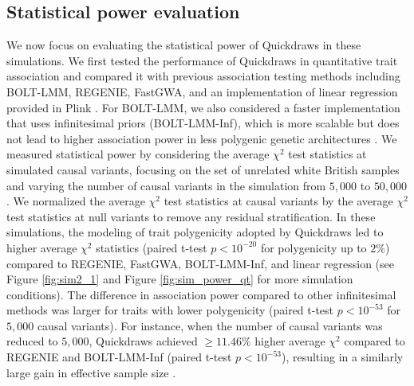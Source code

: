 \endgroup %

\clearpage

\subsection{Statistical power evaluation}
We now focus on evaluating the statistical power of Quickdraws in these simulations.
%
We first tested the performance of Quickdraws in quantitative trait association and compared it with previous association testing methods including BOLT-LMM, REGENIE, FastGWA, and an implementation of linear regression provided in Plink \cite{purcell2007plink,chang2015second}.
%
For BOLT-LMM, we also considered a faster implementation that uses infinitesimal priors (BOLT-LMM-Inf), which is more scalable but does not lead to higher association power in less polygenic genetic architectures \cite{loh2015efficient,loh2018mixed}.
%
We measured statistical power by considering the average $\chi^2$ test statistics at simulated causal variants, focusing on the set of unrelated white British samples and varying the number of causal variants in the simulation from $5{,}000$ to $50{,}000$ \cite{zeng2018signatures}.
%
We normalized the average $\chi^2$ test statistics at causal variants by the average $\chi^2$ test statistics at null variants to remove any residual stratification.
%
In these simulations, the modeling of trait polygenicity adopted by Quickdraws led to higher average $\chi^2$ statistics (paired t-test $p < 10^ {-20}$ for polygenicity up to $2\%$) compared to REGENIE, FastGWA, BOLT-LMM-Inf, and linear regression (see Figure \ref{fig:sim2_1} and Figure \ref{fig:sim_power_qt} for more simulation conditions).
%
The difference in association power compared to other infinitesimal methods was larger for traits with lower polygenicity (paired t-test $p < 10^{-53}$ for $5{,}000$ causal variants).
%
For instance, when the number of causal variants was reduced to ${5{,}000}$, Quickdraws achieved $\geq 11.46\%$ higher average $\chi^2$ compared to REGENIE and BOLT-LMM-Inf (paired t-test $p < 10^{-53}$), resulting in a similarly large gain in effective sample size \cite{yang2011genomic}.
%

